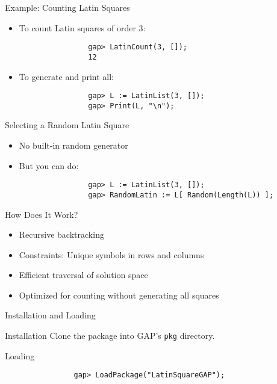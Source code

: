 \documentclass{beamer}
\begin{document}
	\begin{frame}{Example: Counting Latin Squares}
		\begin{itemize}
			\item To count Latin squares of order 3:
			\begin{verbatim}
				gap> LatinCount(3, []);
				12
			\end{verbatim}
			\item To generate and print all:
			\begin{verbatim}
				gap> L := LatinList(3, []);
				gap> Print(L, "\n");
			\end{verbatim}
		\end{itemize}
	\end{frame}
	
	\begin{frame}{Selecting a Random Latin Square}
		\begin{itemize}
			\item No built-in random generator
			\item But you can do:
			\begin{verbatim}
				gap> L := LatinList(3, []);
				gap> RandomLatin := L[ Random(Length(L)) ];
			\end{verbatim}
		\end{itemize}
	\end{frame}
	
	\begin{frame}{How Does It Work?}
		\begin{itemize}
			\item Recursive backtracking
			\item Constraints: Unique symbols in rows and columns
			\item Efficient traversal of solution space
			\item Optimized for counting without generating all squares
		\end{itemize}
	\end{frame}
	
	\begin{frame}{Installation and Loading}
		\begin{block}{Installation}
			Clone the package into GAP's \texttt{pkg} directory.
		\end{block}
		\begin{block}{Loading}
			\begin{verbatim}
				gap> LoadPackage("LatinSquareGAP");
			\end{verbatim}
		\end{block}
	\end{frame}
	
\end{document}

